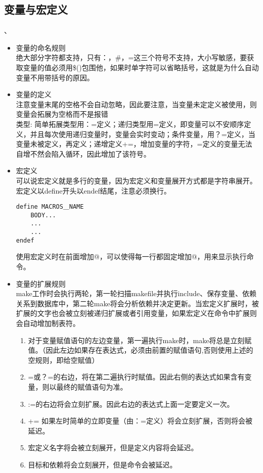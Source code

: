   \subsection{变量与宏定义} 、
	\begin{itemize}
		\item 变量的命名规则\\
		绝大部分字符都支持，只有：，\#，=这三个符号不支持，大小写敏感，要获取变量的值必须用\$()包围他，如果时单字符可以省略括号，这就是为什么自动变量不用带括号的原因。
		\item 变量的定义\\
		注意变量末尾的空格不会自动忽略，因此要注意，当变量未定定义被使用，则变量会拓展为空格而不是报错\\
		类型: 简单拓展类型用：=定义；递归类型用=定义，即变量可以不安顺序定义，并且每次使用递归变量时，变量会实时变动；条件变量，用？=定义，当变量未被定义，再定义；递增定义+=，增加变量的字符，=定义的变量无法自增不然会陷入循环，因此增加了该符号。
		\item 宏定义\\
		可以说宏定义就是多行的变量，因为宏定义和变量展开方式都是字符串展开。宏定义以define开头以endef结尾，注意必须换行。
\begin{lstlisting}
define MACROS＿NAME
	BODY...
	...
	...
endef
\end{lstlisting}
		使用宏定义时在前面增加@，可以使得每一行都固定增加@，用来显示执行命令。
	 \item 变量的扩展规则\\
	 	make工作时会执行两轮，第一轮扫描makefile并执行include、保存变量、依赖关系到数据库中，第二轮make将会分析依赖并决定更新。当宏定义扩展时，被扩展的文字也会被立刻被递归扩展或者引用变量，如果宏定义在命令中扩展则会自动增加制表符。
	 	\begin{enumerate}
	 		\item 对于变量赋值语句的左边变量，第一遍执行make时，make将总是立刻赋值。（因此左边如果存在表达式，必须由前置的赋值语句,否则使用上述的空规则，即给空赋值）
	 		\item =或？=的右边，将在第二遍执行时赋值。因此右侧的表达式如果含有变量，则以最终的赋值语句为准。
	 		\item :=的右边将会立刻扩展。因此右边的表达式上面一定要定义一次。
	 		\item += 如果左时简单的立即变量（由：=定义）将会立刻扩展，否则将会被延迟。
	 		\item 宏定义名字将会被立刻展开，但是定义内容将会延迟。
	 		\item 目标和依赖将会立刻展开，但是命令会被延迟。
	 	\end{enumerate}

\end{itemize}
